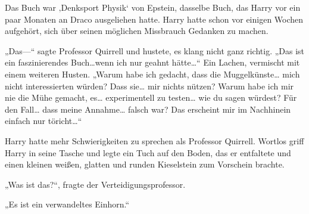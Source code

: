 Das Buch war ‚Denksport Physik‘ von Epstein, dasselbe Buch, das Harry vor ein paar Monaten an Draco ausgeliehen hatte. Harry hatte schon vor einigen Wochen aufgehört, sich über seinen möglichen Missbrauch Gedanken zu machen.

„Das—“
sagte Professor Quirrell und hustete, es klang nicht ganz richtig.
„Das ist ein faszinierendes Buch…wenn ich nur geahnt hätte…“
Ein Lachen, vermischt mit einem weiteren Husten.
„Warum habe ich gedacht, dass die Muggelkünste… mich nicht interessierten würden? Dass sie… mir nichts nützen? Warum habe ich mir nie die Mühe gemacht, es… experimentell zu testen… wie du sagen würdest? Für den Fall… dass meine Annahme… falsch war? Das erscheint mir im Nachhinein einfach nur töricht…“

Harry hatte mehr Schwierigkeiten zu sprechen als Professor Quirrell. Wortlos griff Harry in seine Tasche und legte ein Tuch auf den Boden, das er entfaltete und einen kleinen weißen, glatten und runden Kieselstein zum Vorschein brachte.

„Was ist das?“, fragte der Verteidigungsprofessor.

„Es ist ein verwandeltes Einhorn.“

